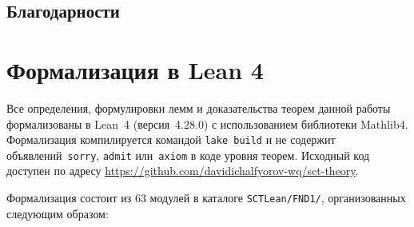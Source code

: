 \documentclass[11pt,a4paper]{article}
\theoremstyle{plain}
\theoremstyle{definition}
\theoremstyle{remark}
\begin{document}
\subsection*{Благодарности}

\appendix

\section{Формализация в Lean 4}
\label{app:lean}

Все определения, формулировки лемм и доказательства теорем данной работы
формализованы в Lean~4 (версия~4.28.0) с использованием библиотеки
Mathlib4. Формализация компилируется командой \texttt{lake build}
и не содержит объявлений~\texttt{sorry}, \texttt{admit}
или~\texttt{axiom} в коде уровня теорем. Исходный код доступен по
адресу \url{https://github.com/davidichalfyorov-wq/sct-theory}.

Формализация состоит из 63 модулей в каталоге
\texttt{SCTLean/FND1/}, организованных следующим образом:
\end{document}
